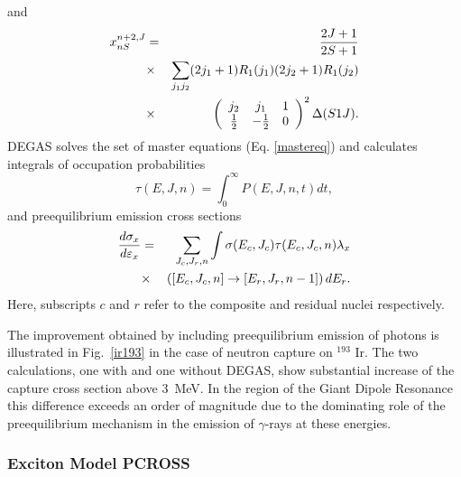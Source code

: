 and 
\begin{eqnarray}
x_{nS}^{n+2,J}&=&\frac{2J+1}{2S+1}  \notag \\
&\times&\sum_{j_{1}j_{2}}(2j_{1}+1)R_{1}(j_{1})(2j_{2}+1)R_{1}(j_{2})  \notag
\\
&\times&\left(%
\begin{array}{ccc}
j_{2} & j_{1} & 1 \\ 
\frac{1}{2} & -\frac{1}{2} & 0%
\end{array}%
\right)^{2}\Delta(S1J).
\end{eqnarray}
DEGAS%
 solves the set of master equations (Eq. \ref{mastereq}) and
calculates integrals of occupation probabilities 
\begin{equation}
\tau(E,J,n)=\int_{0}^{\infty}P(E,J,n,t)dt,
\end{equation}
and preequilibrium emission cross sections 
\begin{eqnarray}
\frac{d\sigma_{x}}{d\varepsilon_{x}}&=&\sum_{J_{c},J_{r},n}\int%
\sigma(E_{c},J_{c})\tau(E_{c},J_{c},n)\lambda_{x}  \notag \\
&\times&\left(\left[E_{c},J_{c},n\right]\rightarrow\left[E_{r},J_{r},n-1%
\right]\right)dE_{r}.
\end{eqnarray}
Here, subscripts $c$ and $r$ refer to the composite and residual nuclei
respectively.

The improvement obtained by including preequilibrium emission of photons is
illustrated in Fig.~\ref{ir193} in the case of neutron capture on $^{193}$%
Ir. The two calculations, one with and one without DEGAS, show substantial
increase of the capture cross section above 3~MeV. In the region of the
Giant Dipole Resonance this difference exceeds an order of magnitude due to
the dominating role of the preequilibrium mechanism in the emission of $%
\gamma$-rays at these energies.

\subsubsection{Exciton Model PCROSS\label{PCROSS}}

